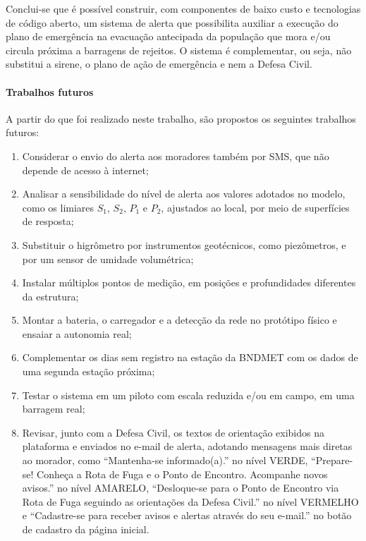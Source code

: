 Conclui-se que é possível construir, com componentes de baixo custo e
tecnologias de código aberto, um sistema de alerta que possibilita
auxiliar a execução do plano de emergência na evacuação antecipada da
população que mora e/ou circula próxima a barragens de rejeitos. O
sistema é complementar, ou seja, não substitui a sirene, o plano de ação de emergência e nem a Defesa Civil.

\paragraph*{Trabalhos futuros}

A partir do que foi realizado neste trabalho, são propostos os seguintes trabalhos futuros:

\begin{enumerate}

  \item Considerar o envio do alerta aos moradores também por SMS, que não depende de
  acesso à internet;

  \item Analisar a sensibilidade do nível de alerta aos valores adotados no
  modelo, como os
  limiares $S_1$, $S_2$, $P_1$ e $P_2$, ajustados ao local, por meio de
  superfícies de resposta;

  \item Substituir o higrômetro por instrumentos geotécnicos, como
  piezômetros, e por um sensor de umidade volumétrica;

  \item Instalar múltiplos pontos de medição, em posições e
  profundidades diferentes da estrutura;

  \item Montar a bateria, o carregador e a detecção da rede no
  protótipo físico e ensaiar a autonomia real;

  \item Complementar os dias sem registro na estação da BNDMET com os
  dados de uma segunda estação próxima;

  \item Testar o sistema em um piloto com escala reduzida e/ou em campo, em uma barragem real;

  \item Revisar, junto com a Defesa Civil, os textos de orientação exibidos na plataforma e enviados no e-mail de alerta, adotando mensagens mais diretas ao morador, como ``Mantenha-se informado(a).'' no nível VERDE, ``Prepare-se! Conheça a Rota de Fuga e o Ponto de Encontro. Acompanhe novos avisos.'' no nível AMARELO, ``Desloque-se para o Ponto de Encontro via Rota de Fuga seguindo as orientações da Defesa Civil.'' no nível VERMELHO e ``Cadastre-se para receber avisos e alertas através do seu e-mail.'' no botão de cadastro da página inicial.

\end{enumerate}
